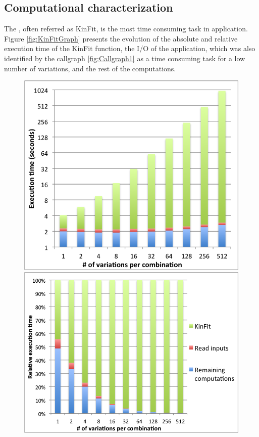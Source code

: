 \subsection{Computational characterization}
\label{ComputationalCharactrization}

The \ttDilepKinFit, often referred as KinFit, is the most time consuming task in \tth application. Figure \ref{fig:KinFitGraph} presents the evolution of the absolute and relative execution time of the KinFit function, the I/O of the application, which was also identified by the callgraph \ref{fig:Callgraph1} as a time consuming task for a low number of variations, and the rest of the computations.

\begin{figure}
	\centering
	\begin{minipage}{.5\textwidth}
		\centering
		\includegraphics[scale=0.6]{../../common/graphs/exec_time_kinfit_rest.png}
	\end{minipage}%
	\begin{minipage}{.5\textwidth}
		\centering
		\includegraphics[scale=0.6]{../../common/graphs/relative_exec_time_kinfit_rest.png}  

\end{minipage}
\end{figure}
